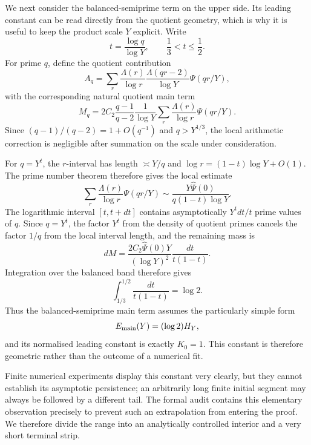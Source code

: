 \documentclass{aomart}
\theoremstyle{definition}
\newcommand{\1}{\mathbf 1}
\begin{document}
We next consider the balanced-semiprime term on the upper side.  Its leading constant can be read directly from the quotient geometry, which is why it is useful to keep the product scale $Y$ explicit.  Write
\[
 t=\frac{\log q}{\log Y},\qquad \frac13<t\le\frac12.
\]
For prime $q$, define the quotient contribution
\begin{equation}\label{eq:Aq}
 A_q=\sum_r\frac{\Lambda(r)}{\log r}\frac{\Lambda(qr-2)}{\log Y}\Psi(qr/Y),
\end{equation}
with the corresponding natural quotient main term
\begin{equation}\label{eq:Mq}
 M_q=2C_2\frac{q-1}{q-2}\frac1{\log Y}
 \sum_r\frac{\Lambda(r)}{\log r}\Psi(qr/Y).
\end{equation}
Since $(q-1)/(q-2)=1+O(q^{-1})$ and $q>Y^{1/3}$, the local arithmetic correction is negligible after summation on the scale under consideration.

For $q=Y^t$, the $r$-interval has length $\asymp Y/q$ and $\log r=(1-t)\log Y+O(1)$.  The prime number theorem therefore gives the local estimate
\[
 \sum_r\frac{\Lambda(r)}{\log r}\Psi(qr/Y)
 \sim \frac{Y\widehat\Psi(0)}{q(1-t)\log Y}.
\]
The logarithmic interval $[t,t+dt]$ contains asymptotically $Y^t dt/t$ prime values of $q$.  Since $q=Y^t$, the factor $Y^t$ from the density of quotient primes cancels the factor $1/q$ from the local interval length, and the remaining mass is
\begin{equation}\label{eq:dM}
 dM=\frac{2C_2\widehat\Psi(0)Y}{(\log Y)^2}\frac{dt}{t(1-t)}.
\end{equation}
Integration over the balanced band therefore gives
\begin{equation}\label{eq:log2}
 \int_{1/3}^{1/2}\frac{dt}{t(1-t)}=\log2.
\end{equation}
Thus the balanced-semiprime main term assumes the particularly simple form
\begin{equation}\label{eq:Emain}
 E_{\rm main}(Y)=(\log2)H_Y,
\end{equation}
and its normalised leading constant is exactly $K_0=1$.  This constant is therefore geometric rather than the outcome of a numerical fit.

Finite numerical experiments display this constant very clearly, but they cannot establish its asymptotic persistence; an arbitrarily long finite initial segment may always be followed by a different tail.  The formal audit contains this elementary observation precisely to prevent such an extrapolation from entering the proof.  We therefore divide the range into an analytically controlled interior and a very short terminal strip.
\end{document}
